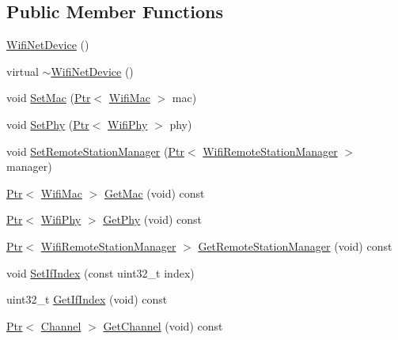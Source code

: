\subsection*{Public Member Functions}
\begin{DoxyCompactItemize}
\item 
\hyperlink{classns3_1_1WifiNetDevice_ae62084ee569c4be1337e00cc754f7c20}{Wifi\+Net\+Device} ()
\item 
virtual \hyperlink{classns3_1_1WifiNetDevice_a043176eea9be8c74eafa489c255eb487}{$\sim$\+Wifi\+Net\+Device} ()
\item 
void \hyperlink{classns3_1_1WifiNetDevice_aabe7ae9cc468ac1702ee1abea1294828}{Set\+Mac} (\hyperlink{classns3_1_1Ptr}{Ptr}$<$ \hyperlink{classns3_1_1WifiMac}{Wifi\+Mac} $>$ mac)
\item 
void \hyperlink{classns3_1_1WifiNetDevice_a8bce2115a297537267a08769234da342}{Set\+Phy} (\hyperlink{classns3_1_1Ptr}{Ptr}$<$ \hyperlink{classns3_1_1WifiPhy}{Wifi\+Phy} $>$ phy)
\item 
void \hyperlink{classns3_1_1WifiNetDevice_a63d2f4ecc22fa5cac45585fcc3569d03}{Set\+Remote\+Station\+Manager} (\hyperlink{classns3_1_1Ptr}{Ptr}$<$ \hyperlink{classns3_1_1WifiRemoteStationManager}{Wifi\+Remote\+Station\+Manager} $>$ manager)
\item 
\hyperlink{classns3_1_1Ptr}{Ptr}$<$ \hyperlink{classns3_1_1WifiMac}{Wifi\+Mac} $>$ \hyperlink{classns3_1_1WifiNetDevice_a48a0f63009cc101fd7d8338a7b3dc482}{Get\+Mac} (void) const 
\item 
\hyperlink{classns3_1_1Ptr}{Ptr}$<$ \hyperlink{classns3_1_1WifiPhy}{Wifi\+Phy} $>$ \hyperlink{classns3_1_1WifiNetDevice_a6a752f4afd2e28b04c83ba26568efd78}{Get\+Phy} (void) const 
\item 
\hyperlink{classns3_1_1Ptr}{Ptr}$<$ \hyperlink{classns3_1_1WifiRemoteStationManager}{Wifi\+Remote\+Station\+Manager} $>$ \hyperlink{classns3_1_1WifiNetDevice_a8b8bb06504a6d76552dd626103b1e5fd}{Get\+Remote\+Station\+Manager} (void) const 
\item 
void \hyperlink{classns3_1_1WifiNetDevice_a9d9f5671da84bd3b006bda3e845e14b7}{Set\+If\+Index} (const uint32\+\_\+t index)
\item 
uint32\+\_\+t \hyperlink{classns3_1_1WifiNetDevice_a6ab6ba34192411ac8203c4da52e5c6cc}{Get\+If\+Index} (void) const 
\item 
\hyperlink{classns3_1_1Ptr}{Ptr}$<$ \hyperlink{classns3_1_1Channel}{Channel} $>$ \hyperlink{classns3_1_1WifiNetDevice_adbe5e422750b826652aa6cd8fea0cecb}{Get\+Channel} (void) const 
\item 

\end{DoxyCompactItemize}
